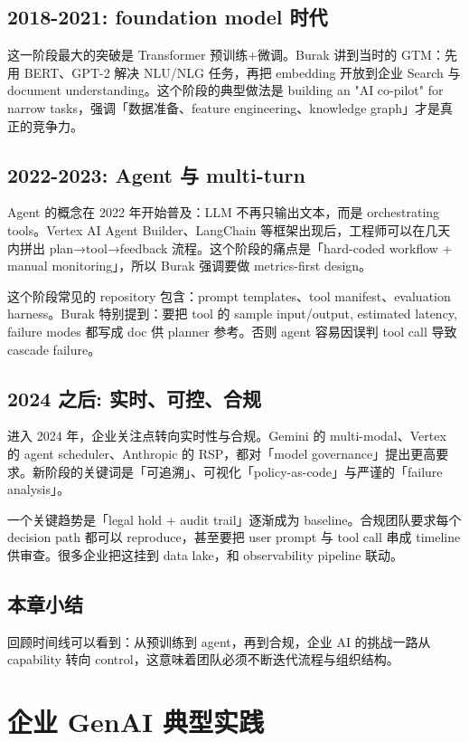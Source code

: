 \documentclass[a4paper]{article}
\begin{document}
\subsection{2018-2021: foundation model 时代}

这一阶段最大的突破是 Transformer 预训练+微调。Burak 讲到当时的 GTM：先用 BERT、GPT-2 解决 NLU/NLG 任务，再把 embedding 开放到企业 Search 与 document understanding。这个阶段的典型做法是 building an "AI co-pilot" for narrow tasks，强调「数据准备、feature engineering、knowledge graph」才是真正的竞争力。

\subsection{2022-2023: Agent 与 multi-turn}
Agent 的概念在 2022 年开始普及：LLM 不再只输出文本，而是 orchestrating tools。Vertex AI Agent Builder、LangChain 等框架出现后，工程师可以在几天内拼出 plan→tool→feedback 流程。这个阶段的痛点是「hard-coded workflow + manual monitoring」，所以 Burak 强调要做 metrics-first design。

这个阶段常见的 repository 包含：prompt templates、tool manifest、evaluation harness。Burak 特别提到：要把 tool 的 sample input/output, estimated latency, failure modes 都写成 doc 供 planner 参考。否则 agent 容易因误判 tool call 导致 cascade failure。

\subsection{2024 之后: 实时、可控、合规}

进入 2024 年，企业关注点转向实时性与合规。Gemini 的 multi-modal、Vertex 的 agent scheduler、Anthropic 的 RSP，都对「model governance」提出更高要求。新阶段的关键词是「可追溯」、可视化「policy-as-code」与严谨的「failure analysis」。

一个关键趋势是「legal hold + audit trail」逐渐成为 baseline。合规团队要求每个 decision path 都可以 reproduce，甚至要把 user prompt 与 tool call 串成 timeline 供审查。很多企业把这挂到 data lake，和 observability pipeline 联动。

\subsection{本章小结}

回顾时间线可以看到：从预训练到 agent，再到合规，企业 AI 的挑战一路从 capability 转向 control，这意味着团队必须不断迭代流程与组织结构。

\section{企业 GenAI 典型实践}
\end{document}
